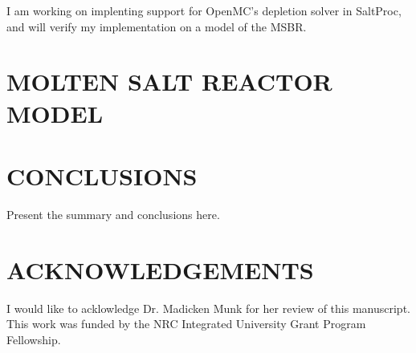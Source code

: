 \documentclass[letterpaper]{mc2023}
\begin{document}
I am working on implenting support for OpenMC's depletion solver in SaltProc,
and will verify my implementation on a model of the MSBR.

\section{MOLTEN SALT REACTOR MODEL}
\label{sec:msr-model}


\section{CONCLUSIONS}

Present the summary and conclusions here.

%

\section*{ACKNOWLEDGEMENTS}
I would like to acklowledge Dr. Madicken Munk for her review of this manuscript.
This work was funded by the NRC Integrated University Grant Program Fellowship.

\newif\ifusebibtex
\usebibtextrue

\ifusebibtex
\setlength{\baselineskip}{12pt}


\else
\setlength{\baselineskip}{12pt}
\begin{thebibliography}{300}
\bibitem{journal} B. Author(s), ``Title, using capitalization'' \emph{Journal Name in Italic}, 
  \textbf{Volume in Bold}, pp. 34-89 (20xx).
\bibitem{proc_paper} C. D. Author(s), ``Article Title,'' \emph{Proceedings of
  Meeting in Italic}, Location, Dates of Meeting, Vol. n, pp. 134-156 
  (20xx).
\bibitem{book} E. F. Author, \emph{Book Title in Italic}, Publisher, City \&
  Country (20xx). 
\bibitem{website} ``Canadian SMR Roadmap,'' \\
  \url{https://smrroadmap.ca/wp-content/uploads/2018/12/Technology-WG.pdf} (2018).
\end{thebibliography}
\fi

\end{document}
